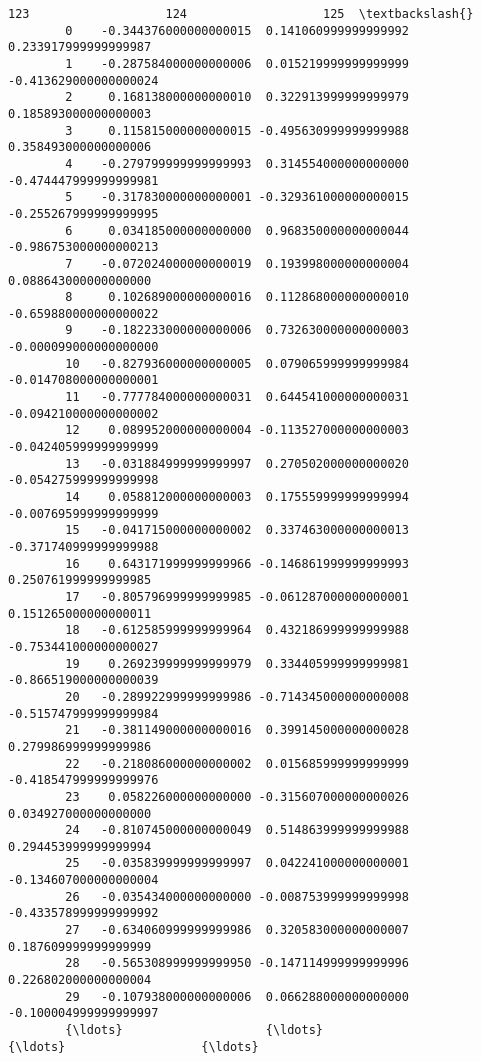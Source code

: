 \documentclass[11pt]{article}
\begin{document}
\begin{Verbatim}[commandchars=\\\{\}]
                               123                   124                   125  \textbackslash{}
        0    -0.344376000000000015  0.141060999999999992  0.233917999999999987   
        1    -0.287584000000000006  0.015219999999999999 -0.413629000000000024   
        2     0.168138000000000010  0.322913999999999979  0.185893000000000003   
        3     0.115815000000000015 -0.495630999999999988  0.358493000000000006   
        4    -0.279799999999999993  0.314554000000000000 -0.474447999999999981   
        5    -0.317830000000000001 -0.329361000000000015 -0.255267999999999995   
        6     0.034185000000000000  0.968350000000000044 -0.986753000000000213   
        7    -0.072024000000000019  0.193998000000000004  0.088643000000000000   
        8     0.102689000000000016  0.112868000000000010 -0.659880000000000022   
        9    -0.182233000000000006  0.732630000000000003 -0.000099000000000000   
        10   -0.827936000000000005  0.079065999999999984 -0.014708000000000001   
        11   -0.777784000000000031  0.644541000000000031 -0.094210000000000002   
        12    0.089952000000000004 -0.113527000000000003 -0.042405999999999999   
        13   -0.031884999999999997  0.270502000000000020 -0.054275999999999998   
        14    0.058812000000000003  0.175559999999999994 -0.007695999999999999   
        15   -0.041715000000000002  0.337463000000000013 -0.371740999999999988   
        16    0.643171999999999966 -0.146861999999999993  0.250761999999999985   
        17   -0.805796999999999985 -0.061287000000000001  0.151265000000000011   
        18   -0.612585999999999964  0.432186999999999988 -0.753441000000000027   
        19    0.269239999999999979  0.334405999999999981 -0.866519000000000039   
        20   -0.289922999999999986 -0.714345000000000008 -0.515747999999999984   
        21   -0.381149000000000016  0.399145000000000028  0.279986999999999986   
        22   -0.218086000000000002  0.015685999999999999 -0.418547999999999976   
        23    0.058226000000000000 -0.315607000000000026  0.034927000000000000   
        24   -0.810745000000000049  0.514863999999999988  0.294453999999999994   
        25   -0.035839999999999997  0.042241000000000001 -0.134607000000000004   
        26   -0.035434000000000000 -0.008753999999999998 -0.433578999999999992   
        27   -0.634060999999999986  0.320583000000000007  0.187609999999999999   
        28   -0.565308999999999950 -0.147114999999999996  0.226802000000000004   
        29   -0.107938000000000006  0.066288000000000000 -0.100004999999999997   
        {\ldots}                    {\ldots}                   {\ldots}                   {\ldots}   

\end{Verbatim}
\end{document}
